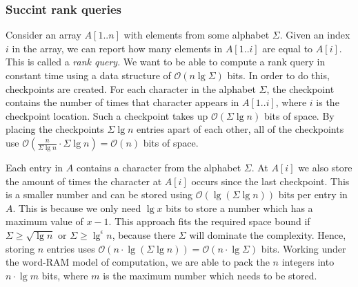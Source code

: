 \subsubsection{Succint rank queries}
\label{sssect:succintrank}
Consider an array $A[1..n]$ with elements from some alphabet $\Sigma$. Given an index $i$ in the array, we can report how many elements in $A[1..i]$ are equal to $A[i]$. This is called a \emph{rank query}. We want to be able to compute a rank query in constant time using a data structure of $\mathcal{O}(n \lg \Sigma)$ bits. In order to do this, checkpoints are created. For each character in the alphabet $\Sigma$, the checkpoint contains the number of times that character appears in $A[1..i]$, where $i$ is the checkpoint location. Such a checkpoint takes up $\mathcal{O}(\Sigma \lg n)$ bits of space. By placing the checkpoints $\Sigma \lg n$ entries apart of each other, all of the checkpoints use $\mathcal{O}(\frac{n}{\Sigma \lg n} \cdot \Sigma \lg n) = \mathcal{O}(n)$ bits of space.

Each entry in $A$ contains a character from the alphabet $\Sigma$. At $A[i]$ we also store the amount of times the character at $A[i]$ occurs since the last checkpoint. This is a smaller number and can be stored using $\mathcal{O}(\lg (\Sigma \lg n))$ bits per entry in $A$. This is because we only need $\lg x$ bits to store a number which has a maximum value of $x-1$. This approach fits the required space bound if $\Sigma \geq \sqrt{\lg n}$ or $\Sigma \geq \lg^\epsilon n$, because there $\Sigma$ will dominate the complexity. Hence, storing $n$ entries uses $\mathcal{O}(n\cdot\lg(\Sigma \lg n)) = \mathcal{O}(n\cdot\lg\Sigma)$ bits. Working under the word-RAM model of computation, we are able to pack the $n$ integers into $n\cdot\lg m$ bits, where $m$ is the maximum number which needs to be stored.



